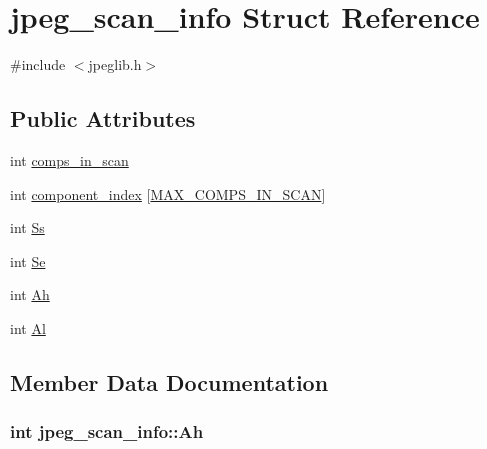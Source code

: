 \hypertarget{structjpeg__scan__info}{}\section{jpeg\+\_\+scan\+\_\+info Struct Reference}
\label{structjpeg__scan__info}


{\ttfamily \#include $<$jpeglib.\+h$>$}

\subsection*{Public Attributes}
\begin{DoxyCompactItemize}
\item 
int \hyperlink{structjpeg__scan__info_addd94bff3ee52f961cf6fda5ea86ddca}{comps\+\_\+in\+\_\+scan}
\item 
int \hyperlink{structjpeg__scan__info_a041f1af60508517345c1b76c48ee6567}{component\+\_\+index} \mbox{[}\hyperlink{jpeglib_8h_adc7013da016c19051dc623fb3d8b35b4}{M\+A\+X\+\_\+\+C\+O\+M\+P\+S\+\_\+\+I\+N\+\_\+\+S\+C\+A\+N}\mbox{]}
\item 
int \hyperlink{structjpeg__scan__info_a33bc5abcded36ccd1b4c2ec94f6e2ba5}{Ss}
\item 
int \hyperlink{structjpeg__scan__info_a4eefb8be0412f78566862c28a20fb254}{Se}
\item 
int \hyperlink{structjpeg__scan__info_a43834ca9482c7ea12cc97cf602da004b}{Ah}
\item 
int \hyperlink{structjpeg__scan__info_a89cc9e990977c50b2b2058e6b9526e67}{Al}
\end{DoxyCompactItemize}


\subsection{Member Data Documentation}
\hypertarget{structjpeg__scan__info_a43834ca9482c7ea12cc97cf602da004b}{}
\subsubsection[{Ah}]{\setlength{\rightskip}{0pt plus 5cm}int jpeg\+\_\+scan\+\_\+info\+::\+Ah}\label{structjpeg__scan__info_a43834ca9482c7ea12cc97cf602da004b}
\hypertarget{structjpeg__scan__info_a89cc9e990977c50b2b2058e6b9526e67}{}
